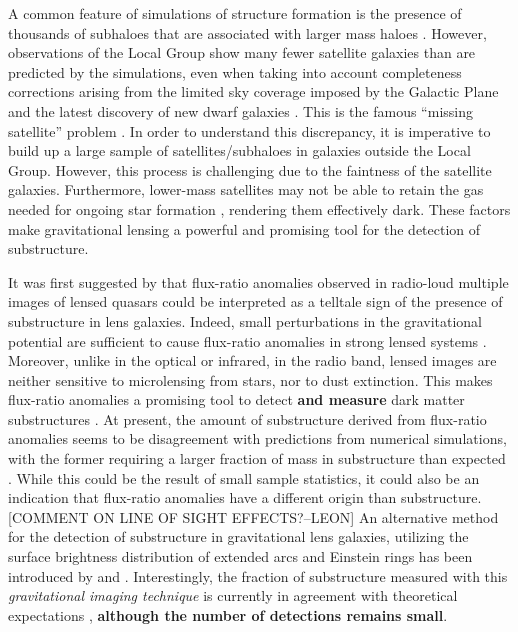 \documentclass[useAMS,usenatbib]{mn2e}
\begin{document}
A common feature of simulations of structure formation is the presence
of thousands of subhaloes that are associated with larger mass haloes \citep[e.g.][]{Springel08}.
However, observations of the Local Group show many fewer satellite
galaxies than are predicted by the simulations, even when taking into
account completeness corrections arising from the limited sky coverage
imposed by the Galactic Plane and the latest discovery of new dwarf galaxies \citep{DES15,Kop15}.  
This is the famous ``missing satellite'' problem \citep{Klypin1999, Moore1999, S07}. In order to
understand this discrepancy, it is imperative to build up a large
sample of satellites/subhaloes in galaxies outside the Local Group.
 However, this process is challenging due to the faintness of the satellite
galaxies.  Furthermore, lower-mass satellites may not be able to
retain the gas needed for ongoing star formation \citep[e.g.,][]{P11},
rendering them effectively dark.  These factors make gravitational
lensing a powerful and promising tool for the detection of
substructure.

It was first suggested by \citet{Mao1998} that flux-ratio anomalies
observed in radio-loud multiple images of lensed quasars could be
interpreted as a telltale sign of the presence of substructure in lens
galaxies.  Indeed, small perturbations in the gravitational potential
are sufficient to cause flux-ratio anomalies in strong lensed systems
\citep{Bradac02}.  Moreover, unlike in the optical or infrared, in the
radio band, lensed images are neither sensitive to microlensing from
stars, nor to dust extinction. This makes flux-ratio anomalies a promising
tool to detect \textbf{and measure} dark matter substructures \citep{Dalal2002,K05,V09,N13}.  
At present, the amount of substructure derived from flux-ratio anomalies
seems to be disagreement with predictions from numerical simulations, with
the former requiring a larger fraction of mass in substructure than
expected \citep{Xu14}. While this could be the result of small sample
statistics, it could also be an indication that flux-ratio anomalies
have a different origin than substructure.[COMMENT ON LINE OF SIGHT EFFECTS?--LEON]
%
An alternative method for
the detection of substructure in gravitational lens galaxies, utilizing
the surface brightness distribution of extended arcs and Einstein rings
has been introduced by \citet{K05} and \citet{V09}. Interestingly, the fraction of
substructure measured with this \emph{gravitational imaging technique}
is currently in agreement with theoretical expectations \citep{V14a,V12}, \textbf{although the number of detections remains small}.
\end{document}
